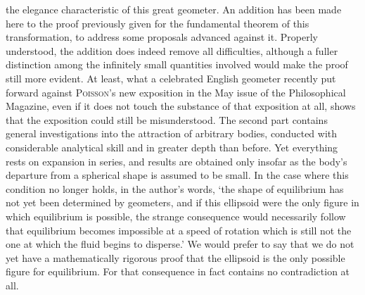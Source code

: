 the elegance characteristic of this great geometer. An addition has been made here to the proof previously given for the fundamental theorem of this transformation, to address some proposals advanced against it. Properly understood, the addition does indeed remove all difficulties, although a fuller distinction among the infinitely small quantities involved would make the proof still more evident. At least, what a celebrated English geometer recently put forward against \textsc{Poisson}'s new exposition in the May issue of the Philosophical Magazine, even if it does not touch the substance of that exposition at all, shows that the exposition could still be misunderstood. The second part contains general investigations into the attraction of arbitrary bodies, conducted with considerable analytical skill and in greater depth than before. Yet everything rests on expansion in series, and results are obtained only insofar as the body's departure from a spherical shape is assumed to be small. In the case where this condition no longer holds, in the author's words, ‘the shape of equilibrium has not yet been determined by geometers, and if this ellipsoid were the only figure in which equilibrium is possible, the strange consequence would necessarily follow that equilibrium becomes impossible at a speed of rotation which is still not the one at which the fluid begins to disperse.’ We would prefer to say that we do not yet have a mathematically rigorous proof that the ellipsoid is the only possible figure for equilibrium. For that consequence in fact contains no contradiction at all.
